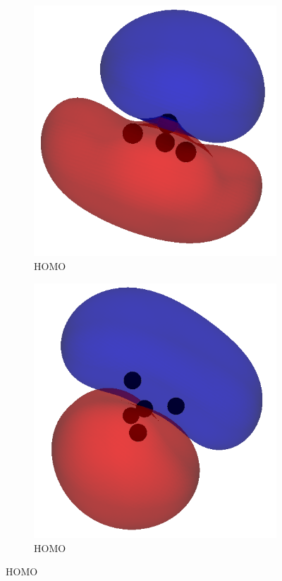 \documentclass[12pt]{article}
\begin{document}
\begin{figure}[H]
    \vspace{1em}
    
    \begin{subfigure}[b]{0.25\textwidth}
        \includegraphics[width=\textwidth]{figures/nh3_homo.png}
        \caption{ HOMO}
    \end{subfigure}
    \hspace{1em}
    \begin{subfigure}[b]{0.25\textwidth}
        \includegraphics[width=\textwidth]{figures/ch4_homo.png}
        \caption{ HOMO}
    \end{subfigure}


\end{figure}
\end{document}

